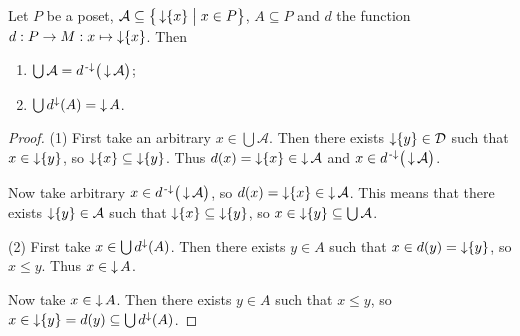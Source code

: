 \begin{lemma} \label{dFunctionLemma}
Let $P$ be a poset, $\mathcal{A} \subseteq \setbuilder[\big]{\downset\{x\}}{x\in P}$,  $A\subseteq P$ and $d$ the function $d: P\to M: x\mapsto \operatorname{\downarrow}\{x\}$. Then
\begin{enumerate}
\item $\bigcup \mathcal{A} = d^{{\text{\hspace{0.15em}-}\downarrow}}\big(\operatorname{\downarrow} \mathcal{A}\big)$;
\item $\bigcup d^\downarrow(A) = \operatorname{\downarrow} A$.
\end{enumerate}
\end{lemma}
\begin{proof}
(1) First take an arbitrary $x\in \bigcup \mathcal{A}$. Then there exists $\operatorname{\downarrow}\{y\}\in \mathcal{D}$ such that $x\in \operatorname{\downarrow}\{y\}$, so $\operatorname{\downarrow}\{x\} \subseteq \operatorname{\downarrow}\{y\}$. Thus $d(x) = \operatorname{\downarrow}\{x\}\in \operatorname{\downarrow}\mathcal{A}$ and $x\in d^{\text{\hspace{0.15em}-}\downarrow}\big(\operatorname{\downarrow} \mathcal{A}\big)$.

Now take arbitrary $x\in d^{{\text{\hspace{0.15em}-}\downarrow}}\big(\operatorname{\downarrow} \mathcal{A}\big)$, so $d(x) = \operatorname{\downarrow}\{x\}\in \operatorname{\downarrow}\mathcal{A}$. This means that there exists $\operatorname{\downarrow}\{y\}\in\mathcal{A}$ such that $\operatorname{\downarrow}\{x\} \subseteq \operatorname{\downarrow}\{y\}$, so $x\in \operatorname{\downarrow}\{y\} \subseteq \bigcup \mathcal{A}$.

(2) First take $x\in \bigcup d^\downarrow(A)$. Then there exists $y\in A$ such that $x\in d(y) = \operatorname{\downarrow}\{y\}$, so $x \leq y$. Thus $x\in \operatorname{\downarrow} A$.

Now take $x\in \operatorname{\downarrow} A$. Then there exists $y\in A$ such that $x\leq y$, so $x\in \operatorname{\downarrow}\{y\} = d(y) \subseteq \bigcup d^\downarrow(A)$.
\end{proof}

